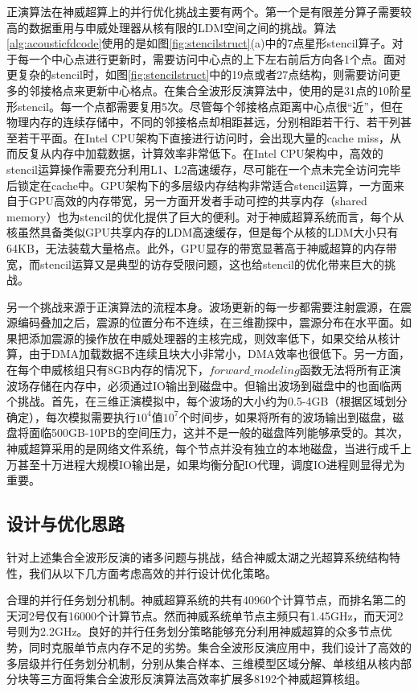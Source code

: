 \documentclass[degree=doctor]{thuthesis}
\begin{document}
正演算法在神威超算上的并行优化挑战主要有两个。第一个是有限差分算子需要较高的数据重用与申威处理器从核有限的LDM空间之间的挑战。算法\ref{alg:acousticfdcode}使用的是如图\ref{fig:stencilstruct}(a)中的7点星形stencil算子。对于每一个中心点进行更新时，需要访问中心点的上下左右前后方向各1个点。面对更复杂的stencil时，如图\ref{fig:stencilstruct}中的19点或者27点结构，则需要访问更多的邻接格点来更新中心格点。在集合全波形反演算法中，使用的是31点的10阶星形stencil。每一个点都需要复用5次。尽管每个邻接格点距离中心点很“近”，但在物理内存的连续存储中，不同的邻接格点却相距甚远，分别相距若干行、若干列甚至若干平面。在Intel CPU架构下直接进行访问时，会出现大量的cache miss，从而反复从内存中加载数据，计算效率非常低下。在Intel CPU架构中，高效的stencil运算操作需要充分利用L1、L2高速缓存，尽可能在一个点未完全访问完毕后锁定在cache中\cite{datta2008stencil,datta2009optimization,sellappa2004cache}。GPU架构下的多层级内存结构非常适合stencil运算，一方面来自于GPU高效的内存带宽，另一方面开发者手动可控的共享内存（shared memory）也为stencil的优化提供了巨大的便利\cite{meng2009performance,nguyen20103,micikevicius20093d}。对于神威超算系统而言，每个从核虽然具备类似GPU共享内存的LDM高速缓存，但是每个从核的LDM大小只有64KB，无法装载大量格点。此外，GPU显存的带宽显著高于神威超算的内存带宽，而stencil运算又是典型的访存受限问题，这也给stencil的优化带来巨大的挑战。

另一个挑战来源于正演算法的流程本身。波场更新的每一步都需要注射震源，在震源编码叠加之后，震源的位置分布不连续，在三维勘探中，震源分布在水平面。如果把添加震源的操作放在申威处理器的主核完成，则效率低下，如果交给从核计算，由于DMA加载数据不连续且块大小非常小，DMA效率也很低下。另一方面，在每个申威核组只有8GB内存的情况下，$forward\_modeling$函数无法将所有正演波场存储在内存中，必须通过IO输出到磁盘中。但输出波场到磁盘中的也面临两个挑战。首先，在三维正演模拟中，每个波场的大小约为0.5-4GB（根据区域划分确定），每次模拟需要执行$10^4$值$10^7$个时间步，如果将所有的波场输出到磁盘，磁盘将面临500GB-10PB的空间压力，这并不是一般的磁盘阵列能够承受的。其次，神威超算采用的是网络文件系统，每个节点并没有独立的本地磁盘，当进行成千上万甚至十万进程大规模IO输出是，如果均衡分配IO代理，调度IO进程则显得尤为重要。


\subsection{设计与优化思路}

针对上述集合全波形反演的诸多问题与挑战，结合神威太湖之光超算系统结构特性，我们从以下几方面考虑高效的并行设计优化策略。

合理的并行任务划分机制。神威超算系统的共有40960个计算节点，而排名第二的天河2号仅有16000个计算节点\cite{tianhe-2}。然而神威系统单节点主频只有1.45GHz，而天河2号则为2.2GHz。良好的并行任务划分策略能够充分利用神威超算的众多节点优势，同时克服单节点内存不足的劣势。集合全波形反演应用中，我们设计了高效的多层级并行任务划分机制，分别从集合样本、三维模型区域分解、单核组从核内部分块等三方面将集合全波形反演算法高效率扩展多8192个神威超算核组。
\end{document}
